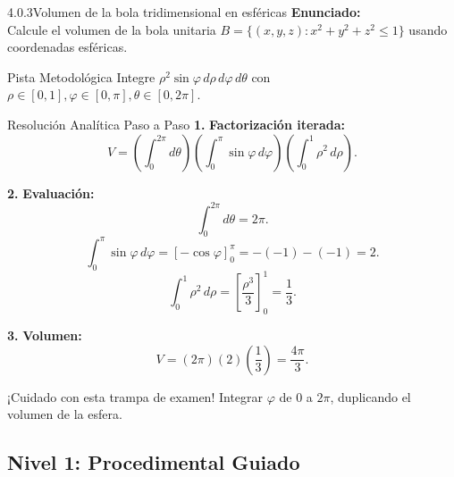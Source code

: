 \documentclass[11pt,a4paper]{article}
\begin{document}
\begin{nivelbox}{4.0.3}{Volumen de la bola tridimensional en esféricas}
\textbf{Enunciado:}\\
Calcule el volumen de la bola unitaria $B = \{ (x,y,z) : x^2 + y^2 + z^2 \le 1 \}$ usando coordenadas esféricas.

\begin{observacionbox}{Pista Metodológica}
Integre $\rho^2\sin\varphi \, d\rho \, d\varphi \, d\theta$ con $\rho \in [0, 1], \varphi \in [0, \pi], \theta \in [0, 2\pi]$.
\end{observacionbox}

\begin{ejerciciobox}{Resolución Analítica Paso a Paso}
\smallskip\noindent\textbf{1.} \textbf{Factorización iterada:}
\[V = \left( \int_0^{2\pi} d\theta \right) \left( \int_0^\pi \sin\varphi \, d\varphi \right) \left( \int_0^1 \rho^2 \, d\rho \right).\]

\smallskip\noindent\textbf{2.} \textbf{Evaluación:}
\[\int_0^{2\pi} d\theta = 2\pi.\]
\[\int_0^\pi \sin\varphi \, d\varphi = [-\cos\varphi]_0^\pi = -(-1) - (-1) = 2.\]
\[\int_0^1 \rho^2 \, d\rho = \left[ \frac{\rho^3}{3} \right]_0^1 = \frac{1}{3}.\]

\smallskip\noindent\textbf{3.} \textbf{Volumen:}
\[V = (2\pi)(2)\left( \frac{1}{3} \right) = \frac{4\pi}{3}.\]
\end{ejerciciobox}

\begin{errorbox}{¡Cuidado con esta trampa de examen!}
Integrar $\varphi$ de $0$ a $2\pi$, duplicando el volumen de la esfera.
\end{errorbox}
\end{nivelbox}
\bigskip

\subsection{Nivel 1: Procedimental Guiado}
\end{document}
